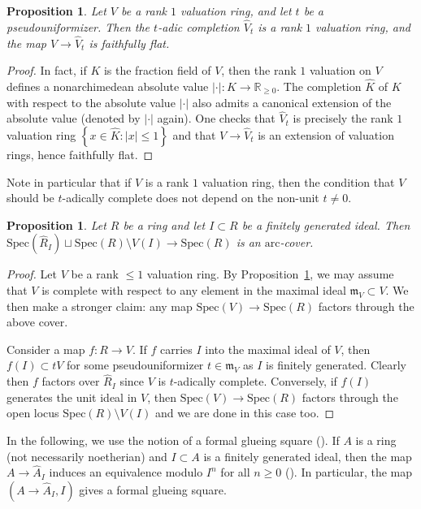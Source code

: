 \documentclass[reqno]{amsart}
\newcommand{\spec}{\mathrm{Spec}}
\newcommand{\arc}{\mathrm{arc}}
\newtheorem{proposition}[theorem]{Proposition}
\theoremstyle{definition}
\begin{document}
\begin{proposition} 
\label{completevaluationring}
Let $V$ be a rank $1$ valuation ring, and let $t$ be a pseudouniformizer. Then the
$t$-adic completion $\hat{V}_t$ is a rank $1$ valuation ring, and the map $V \to
\hat{V}_t$ is faithfully flat. 
\end{proposition} 
\begin{proof} 
In fact, if $K$ is the fraction field of $V$, then the rank $1$ valuation on $V$
defines a nonarchimedean absolute value $|\cdot | \colon  K \to \mathbb{R}_{\geq 0}$. The completion
$\hat{K}$ of $K$ with respect to the absolute value $|\cdot|$ also admits a
canonical
extension of the 
absolute value (denoted by $|\cdot|$ again). One checks that $\hat{V}_t$ is
precisely the rank $1$ valuation ring $\left\{x \in \hat{K}: |x| \leq 1\right\}
$ and that $V \to \hat{V}_t$ is an extension of valuation rings, hence
faithfully flat. 
\end{proof} 

Note in particular that if $V$ is a rank $1$ valuation ring, then the condition
that $V$ should be $t$-adically complete does not depend on the non-unit $t \neq
0$. 

\begin{proposition} 
\label{completeisarccover}
Let $R$ be a ring and let $I \subset R$ be a finitely generated ideal. Then
$\spec ( \hat{R}_I) \sqcup \spec(R) \setminus V(I) \to \spec(R)$ is an
$\arc$-cover. 
\end{proposition} 
\begin{proof} 
Let $V$ be a rank $\leq 1$ valuation ring. By Proposition~\ref{completevaluationring}, we may assume
that $V$ is complete with respect to any element in the maximal ideal
$\mathfrak{m}_V \subset V$. 
We then make a stronger claim: any map $\spec(V) \to \spec(R)$ factors through
the above cover. 

Consider a map $f\colon  R \to V$. If $f$ carries $I$ into the maximal ideal of $V$,
then $f(I) \subset tV$ for some pseudouniformizer $t \in \mathfrak{m}_V$ as $I$ is finitely generated. Clearly 
then $f$ factors over $\hat{R}_I$ since $V$ is $t$-adically complete. 
Conversely, if $f(I) $ generates the unit ideal in $V$, then $\spec(V) \to
\spec(R)$ factors through the open locus $\spec(R) \setminus V(I)$ and we are
done in this case too. 
\end{proof} 

In the following, we use the notion of a formal glueing square
(). 
If $A$ is a ring (not
necessarily noetherian) and $I
\subset A$ is a finitely generated ideal, then the map $A \to \hat{A}_I$ induces
an equivalence modulo $I^n$ for all $n \geq 0$ (\cite[Tag 00M9]{stacks-project}).
In particular, the map $(A \to
\hat{A}_I, I)$ gives a formal glueing square. 
\end{document}
